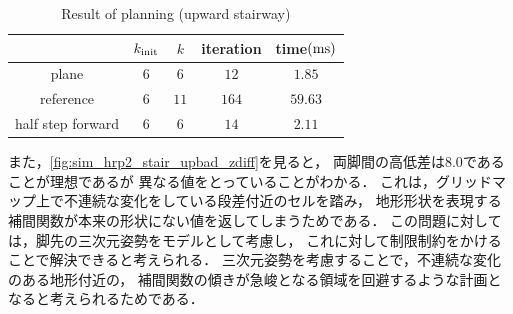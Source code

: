 \documentclass[autodetect-engine,dvipdfmx-if-dvi,ja=standard,a4j,jbase=11pt,magstyle=nomag*]{bxjsreport}
\begin{document}
\begin{table}[pt]%
    \caption{Result of planning (upward stairway)}%
    \label{tab:sim_hrp2_stair_up}%
    \centering%
    \begin{tabular}{ccccc}%
        \toprule%
                            &   $k_{\mathrm{init}}$ &   $k$     &   iteration   &   time$(\si{\milli\second})$ \\%
        \midrule%
        plane               &   $6$         &   $6$     &   $12$        &   $1.85$ \\%
        reference           &   $6$         &   $11$    &   $164$       &   $59.63$ \\%
        half step forward   &   $6$         &   $6$     &   $14$        &   $2.11$ \\%
        \bottomrule%
    \end{tabular}%
\end{table}

また，\cref{fig:sim_hrp2_stair_upbad_zdiff}を見ると，
両脚間の高低差は$8.0$であることが理想であるが
異なる値をとっていることがわかる．
これは，グリッドマップ上で不連続な変化をしている段差付近のセルを踏み，
地形形状を表現する補間関数が本来の形状にない値を返してしまうためである．
この問題に対しては，脚先の三次元姿勢をモデルとして考慮し，
これに対して制限制約をかけることで解決できると考えられる．
三次元姿勢を考慮することで，不連続な変化のある地形付近の，
補間関数の傾きが急峻となる領域を回避するような計画となると考えられるためである．
\end{document}
